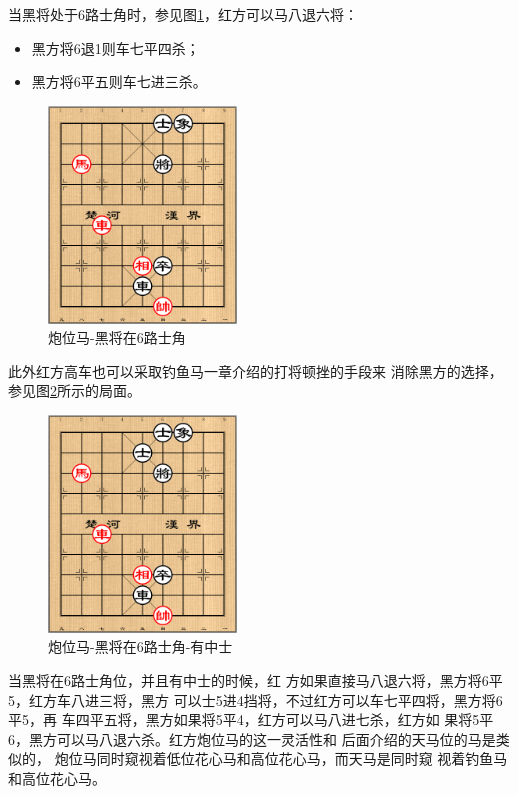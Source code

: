 \documentclass[a5paper,twoside]{book}
\begin{document}
当黑将处于6路士角时，参见图\ref{pwm-hjz6lsj}，红方可以马八退六将：
\begin{itemize}
\item 黑方将6退1则车七平四杀；
\item 黑方将6平五则车七进三杀。
\end{itemize}

\begin{figure}[H]
\centering
\includegraphics[width=5cm]{pic/炮位马-黑将在6路士角.png}
\caption{\label{pwm-hjz6lsj}炮位马-黑将在6路士角}
\end{figure}

此外红方高车也可以采取钓鱼马一章介绍的打将顿挫的手段来
消除黑方的选择，参见图\ref{pwm-hjz6lsj-yzs}所示的局面。

\begin{figure}[H]
\centering
\includegraphics[width=5cm]{pic/炮位马-黑将在6路士角-有中士.png}
\caption{\label{pwm-hjz6lsj-yzs}炮位马-黑将在6路士角-有中士}
\end{figure}


当黑将在6路士角位，并且有中士的时候，红
方如果直接马八退六将，黑方将6平5，红方车八进三将，黑方
可以士5进4挡将，不过红方可以车七平四将，黑方将6平5，再
车四平五将，黑方如果将5平4，红方可以马八进七杀，红方如
果将5平6，黑方可以马八退六杀。红方炮位马的这一灵活性和
后面介绍的天马位的马是类似的，
炮位马同时窥视着低位花心马和高位花心马，而天马是同时窥
视着钓鱼马和高位花心马。
\end{document}
